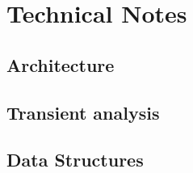 %
%
%
%
\chapter{Technical Notes}

\section{Architecture}


\section{Transient analysis}




\section{Data Structures}



